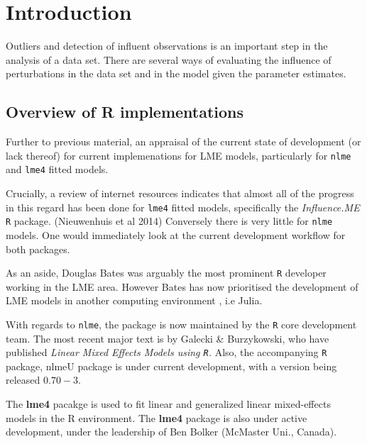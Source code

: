 \documentclass[12pt, a4paper]{report}
\begin{document}

\section{Introduction}

Outliers and detection of influent observations is an important step in the analysis of a data set. There are several ways of evaluating the influence of perturbations in the data set and in the model given the parameter estimates. 

\subsection{Overview of R implementations}
Further to previous material, an appraisal of the current state of development (or lack thereof) for current implemenations for LME models, particularly for \texttt{nlme} and \texttt{lme4} fitted models.

Crucially, a review of internet resources indicates that almost all of the progress in this regard has been done for \texttt{lme4} fitted models, specifically the \textit{Influence.ME} \texttt{R} package. (Nieuwenhuis et al 2014)
Conversely there is very little for \texttt{nlme} models. One would immediately look at the current development workflow for both packages.


As an aside, Douglas Bates was arguably the most prominent \texttt{R} developer working in the LME area. 
However Bates has now prioritised the development of LME models in another computing environment , i.e Julia. 


With regards to \texttt{nlme}, the package is now maintained by the \texttt{R} core development team. The most recent major text is by Galecki \& Burzykowski, who have published \textit{ Linear Mixed Effects Models using \texttt{R}. }
Also, the accompanying \texttt{R} package, nlmeU package is under current development, with a version being released $0.70-3$.



The \textbf{lme4} pacakge is used to fit linear and generalized linear mixed-effects models in the R environment.
The \textbf{lme4} package is also under active development, under the leadership of Ben Bolker (McMaster Uni., Canada).
\end{document}
